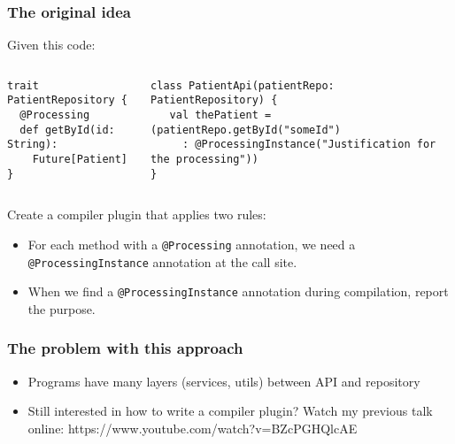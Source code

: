 \documentclass[aspectratio=169]{beamer}
\begin{document}
\begin{frame}[fragile]
  \frametitle{The original idea}

Given this code: 
\begin{columns}
\begin{column}{0.3\textwidth}

\begin{lstlisting}[style=myScalastyle,frame=none]
trait PatientRepository {
  @Processing
  def getById(id: String):
    Future[Patient]
}
\end{lstlisting}


\end{column}

\begin{column}{0.7\textwidth}  

\begin{lstlisting}[style=myScalastyle,frame=none]
class PatientApi(patientRepo: PatientRepository) {
   val thePatient = (patientRepo.getById("someId")
     : @ProcessingInstance("Justification for the processing"))
}
\end{lstlisting}

\end{column}
\end{columns}

Create a compiler plugin that applies two rules:
\begin{itemize}
  \item For each method with a \texttt{@Processing} annotation, we need a \texttt{@ProcessingInstance} annotation at the call site.
  \item When we find a \texttt{@ProcessingInstance} annotation during compilation, report the purpose.
\end{itemize}

\end{frame}

\begin{frame}
  \frametitle{The problem with this approach}
  
  \begin{itemize}
    \item Programs have many layers (services, utils) between API and repository
    \pause
    \item Still interested in how to write a compiler plugin? Watch my previous talk online: https://www.youtube.com/watch?v=BZcPGHQlcAE
  \end{itemize}
\end{frame}


\end{document}
